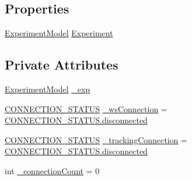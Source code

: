 \subsection*{Properties}
\begin{DoxyCompactItemize}
\item 
\hyperlink{class_web_analyzer_1_1_models_1_1_base_1_1_experiment_model}{Experiment\+Model} \hyperlink{class_web_analyzer_1_1_u_i_1_1_interaction_objects_1_1_experiment_object_a2b87e06b55663703f1017c95c19bfa29}{Experiment}
\end{DoxyCompactItemize}
\subsection*{Private Attributes}
\begin{DoxyCompactItemize}
\item 
\hyperlink{class_web_analyzer_1_1_models_1_1_base_1_1_experiment_model}{Experiment\+Model} \hyperlink{class_web_analyzer_1_1_u_i_1_1_interaction_objects_1_1_experiment_object_a8275ff9c2a3971c6250a462e7e248843}{\+\_\+exp}
\item 
\hyperlink{class_web_analyzer_1_1_u_i_1_1_interaction_objects_1_1_experiment_object_a2875208b4f4b0ed643593152f4ec025c}{C\+O\+N\+N\+E\+C\+T\+I\+O\+N\+\_\+\+S\+T\+A\+T\+U\+S} \hyperlink{class_web_analyzer_1_1_u_i_1_1_interaction_objects_1_1_experiment_object_a37bc6281799039ec5d51c400ddb07ca0}{\+\_\+ws\+Connection} = \hyperlink{class_web_analyzer_1_1_u_i_1_1_interaction_objects_1_1_experiment_object_a2875208b4f4b0ed643593152f4ec025ca3a561116f0c9675a3c83d21fa365050d}{C\+O\+N\+N\+E\+C\+T\+I\+O\+N\+\_\+\+S\+T\+A\+T\+U\+S.\+disconnected}
\item 
\hyperlink{class_web_analyzer_1_1_u_i_1_1_interaction_objects_1_1_experiment_object_a2875208b4f4b0ed643593152f4ec025c}{C\+O\+N\+N\+E\+C\+T\+I\+O\+N\+\_\+\+S\+T\+A\+T\+U\+S} \hyperlink{class_web_analyzer_1_1_u_i_1_1_interaction_objects_1_1_experiment_object_a7cb71354914a07dab1f19146216aa777}{\+\_\+tracking\+Connection} = \hyperlink{class_web_analyzer_1_1_u_i_1_1_interaction_objects_1_1_experiment_object_a2875208b4f4b0ed643593152f4ec025ca3a561116f0c9675a3c83d21fa365050d}{C\+O\+N\+N\+E\+C\+T\+I\+O\+N\+\_\+\+S\+T\+A\+T\+U\+S.\+disconnected}
\item 
int \hyperlink{class_web_analyzer_1_1_u_i_1_1_interaction_objects_1_1_experiment_object_a1f1e01810382952ce7e524f55f8cbdd7}{\+\_\+connection\+Count} = 0
\end{DoxyCompactItemize}



